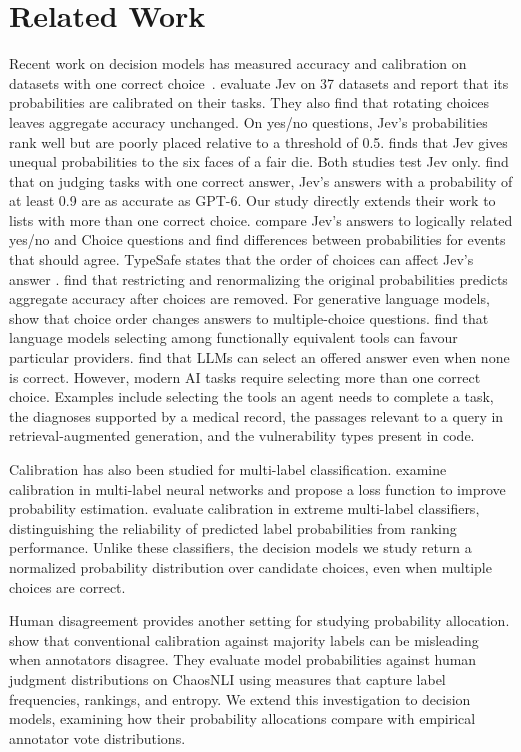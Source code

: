 \section{Related Work}
\label{sec:related}

Recent work on decision models has measured accuracy and calibration on datasets with one correct choice~\citep{porcedda2026jev}. \citet{deusser2026evaluating} evaluate Jev on 37 datasets and report that its probabilities are calibrated on their tasks. They also find that rotating choices leaves aggregate accuracy unchanged. On yes/no questions, Jev's probabilities rank well but are poorly placed relative to a threshold of 0.5. \citet{liu2026dice} finds that Jev gives unequal probabilities to the six faces of a fair die. Both studies test Jev only. \citet{li2026judge} find that on judging tasks with one correct answer, Jev's answers with a probability of at least 0.9 are as accurate as GPT-6. Our study directly extends their work to lists with more than one correct choice. \citet{li2026beyond} compare Jev's answers to logically related yes/no and Choice questions and find differences between probabilities for events that should agree. TypeSafe states that the order of choices can affect Jev's answer \citep{typesafe2026jev}. \citet{li2026readout} find that restricting and renormalizing the original probabilities predicts aggregate accuracy after choices are removed. For generative language models, \citet{zheng2024large,pezeshkpour2024large} show that choice order changes answers to multiple-choice questions. \citet{blankenstein2026biasbusters} find that language models selecting among functionally equivalent tools can favour particular providers. \citet{wang2025leastincorrect} find that LLMs can select an offered answer even when none is correct. However, modern AI tasks require selecting more than one correct choice. Examples include selecting the tools an agent needs to complete a task, the diagnoses supported by a medical record, the passages relevant to a query in retrieval-augmented generation, and the vulnerability types present in code.

Calibration has also been studied for multi-label classification. \citet{cheng2024calibrated} examine calibration in multi-label neural networks and propose a loss function to improve probability estimation. \citet{ullah2025calibrated} evaluate calibration in extreme multi-label classifiers, distinguishing the reliability of predicted label probabilities from ranking performance. Unlike these classifiers, the decision models we study return a normalized probability distribution over candidate choices, even when multiple choices are correct.

Human disagreement provides another setting for studying probability allocation. \citet{baan-etal-2022-stop} show that conventional calibration against majority labels can be misleading when annotators disagree. They evaluate model probabilities against human judgment distributions on ChaosNLI using measures that capture label frequencies, rankings, and entropy. We extend this investigation to decision models, examining how their probability allocations compare with empirical annotator vote distributions.
